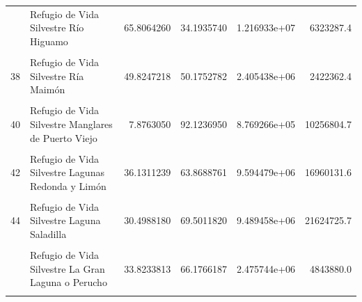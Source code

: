 \documentclass[10pt,landscape,a3paper]{article}
\begin{document}
\begin{longtable}[t]{llrrrr}
\addlinespace
36 & Refugio de Vida Silvestre Río Higuamo & 65.8064260 & 34.1935740 & 1.216933e+07 & 6323287.4\\
\cellcolor{lightgray}{37} & \cellcolor{lightgray}{Refugio de Vida Silvestre Río Chacuey} & \cellcolor{lightgray}{77.3000664} & \cellcolor{lightgray}{22.6999336} & \cellcolor{lightgray}{2.997265e+07} & \cellcolor{lightgray}{8801768.0}\\
38 & Refugio de Vida Silvestre Ría Maimón & 49.8247218 & 50.1752782 & 2.405438e+06 & 2422362.4\\
\cellcolor{lightgray}{39} & \cellcolor{lightgray}{Refugio de Vida Silvestre Monumento Natural Miguel Domingo Fuerte} & \cellcolor{lightgray}{84.0686221} & \cellcolor{lightgray}{15.9313779} & \cellcolor{lightgray}{2.818711e+07} & \cellcolor{lightgray}{5341582.1}\\
40 & Refugio de Vida Silvestre Manglares de Puerto Viejo & 7.8763050 & 92.1236950 & 8.769266e+05 & 10256804.7\\
\addlinespace
\cellcolor{lightgray}{41} & \cellcolor{lightgray}{Refugio de Vida Silvestre Manglar de la Jina} & \cellcolor{lightgray}{24.9558113} & \cellcolor{lightgray}{75.0441887} & \cellcolor{lightgray}{1.319275e+07} & \cellcolor{lightgray}{39671701.7}\\
42 & Refugio de Vida Silvestre Lagunas Redonda y Limón & 36.1311239 & 63.8688761 & 9.594479e+06 & 16960131.6\\
\cellcolor{lightgray}{43} & \cellcolor{lightgray}{Refugio de Vida Silvestre Lagunas de Bávaro y El Caletón} & \cellcolor{lightgray}{20.4231831} & \cellcolor{lightgray}{79.5768169} & \cellcolor{lightgray}{1.307073e+06} & \cellcolor{lightgray}{5092873.7}\\
44 & Refugio de Vida Silvestre Laguna Saladilla & 30.4988180 & 69.5011820 & 9.489458e+06 & 21624725.7\\
\cellcolor{lightgray}{45} & \cellcolor{lightgray}{Refugio de Vida Silvestre Laguna Cabral o Rincón} & \cellcolor{lightgray}{4.0765686} & \cellcolor{lightgray}{95.9234314} & \cellcolor{lightgray}{2.284298e+06} & \cellcolor{lightgray}{53750526.7}\\
\addlinespace
46 & Refugio de Vida Silvestre La Gran Laguna o Perucho & 33.8233813 & 66.1766187 & 2.475744e+06 & 4843880.0\\
\cellcolor{lightgray}{47} & \cellcolor{lightgray}{Refugio de Vida Silvestre Humedales del Bajo Yaque del Sur} & \cellcolor{lightgray}{3.8745155} & \cellcolor{lightgray}{96.1254845} & \cellcolor{lightgray}{2.265132e+06} & \cellcolor{lightgray}{56197194.2}\\

\end{longtable}
\end{document}
